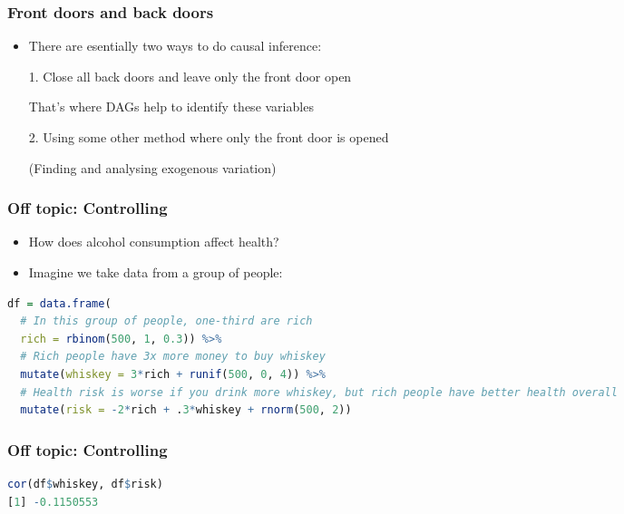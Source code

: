 \documentclass[aspectratio=43]{beamer}
\begin{document}
\begin{frame}
\frametitle{Front doors and back doors}
\centering

\begin{itemize}
  \item There are esentially two ways to do causal inference:
  \item[1.] Close all back doors and leave only the front door open
  \item[] That's where DAGs help to identify these variables
  \item[]
  \item[2.] Using some other method where only the front door is opened
  \item[] (Finding and analysing exogenous variation)
\end{itemize}

\end{frame}

\begin{frame}[fragile]
\frametitle{Off topic: Controlling}
\centering

\begin{itemize}
  \item How does alcohol consumption affect health?
  \item Imagine we take data from a group of people:
\end{itemize}

 \begin{lstlisting}[language=R]
df = data.frame(
  # In this group of people, one-third are rich
  rich = rbinom(500, 1, 0.3)) %>%
  # Rich people have 3x more money to buy whiskey
  mutate(whiskey = 3*rich + runif(500, 0, 4)) %>%
  # Health risk is worse if you drink more whiskey, but rich people have better health overall
  mutate(risk = -2*rich + .3*whiskey + rnorm(500, 2))
 \end{lstlisting}

\end{frame}

\begin{frame}[fragile]
\frametitle{Off topic: Controlling}
\centering

\begin{lstlisting}[language=R]
cor(df$whiskey, df$risk)
[1] -0.1150553
\end{lstlisting}

\end{frame}
\end{document}
